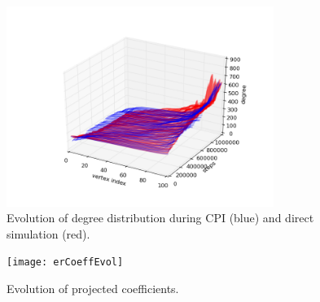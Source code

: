 \documentclass[11pt]{article}
\begin{document}
\begin{figure}
  \centering
  \includegraphics[height=65mm]{erCPI}
  \caption{Evolution of degree distribution during CPI (blue) and direct simulation (red).}
  \label{fig:erRecon}
\end{figure}

\begin{figure}
  \centering
  \texttt{[image: erCoeffEvol]}
  \caption{Evolution of projected coefficients.}
  \label{fig:erEvol}
\end{figure}

\end{document}

